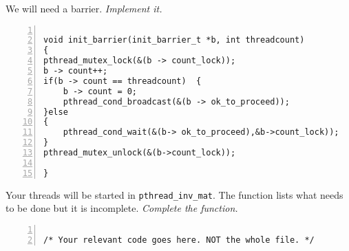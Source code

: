 \documentclass{article}
\begin{document}

\begin{ExerciseList}
\Exercise We will need a barrier.
\Question \emph{Implement it.}
\end{ExerciseList}

\begin{lstlisting}[basicstyle=\small\sffamily,
keywords={break,case,const,continue,default,else,enum,
for,if,return,switch,while,do,long,void,int,float,double,
char,struct,typedef,include,size\_t},
keywordstyle={\color{blue}},
comment={[l]{//}}, morecomment={[s]{/*}{*/}}, commentstyle=\itshape,
columns={[l]flexible}, numbers=left, numberstyle=\tiny,
frameround=fftt, frame=shadowbox, captionpos=b,
caption={Your barrier implementation.},
label=LST:barrier]

void init_barrier(init_barrier_t *b, int threadcount)
{
pthread_mutex_lock(&(b -> count_lock));
b -> count++;
if(b -> count == threadcount)  { 
	b -> count = 0;
	pthread_cond_broadcast(&(b -> ok_to_proceed));
}else 
{
	pthread_cond_wait(&(b-> ok_to_proceed),&b->count_lock));
}
pthread_mutex_unlock(&(b->count_lock));

}
\end{lstlisting}

\begin{ExerciseList}
  \Exercise Your threads will be started in
  \texttt{pthread\_inv\_mat}. The function lists what needs to be done
  but it is incomplete.
  \Question \emph{Complete the function.}
\end{ExerciseList}

\begin{lstlisting}[basicstyle=\small\sffamily,
keywords={break,case,const,continue,default,else,enum,
for,if,return,switch,while,do,long,void,int,float,double,
char,struct,typedef,include,size\_t},
keywordstyle={\color{blue}},
comment={[l]{//}}, morecomment={[s]{/*}{*/}}, commentstyle=\itshape,
columns={[l]flexible}, numbers=left, numberstyle=\tiny,
frameround=fftt, frame=shadowbox, captionpos=b,
caption={Function \texttt{pthread\_inv\_mat}.},
label=LST:pinvmat]

/* Your relevant code goes here. NOT the whole file. */
\end{lstlisting}

\end{document}

